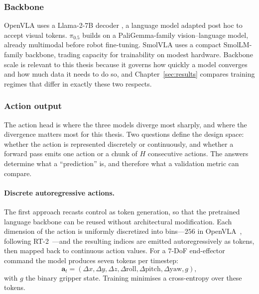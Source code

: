 \documentclass[english,12pt,a4paper,pdftex,elec,utf8]{aaltothesis}
\begin{document}
\subsubsection{Backbone}
\label{subsubsec:language}
OpenVLA uses a Llama-2-7B decoder \citep{touvron2023llama}, a language model adapted post hoc to accept visual tokens. $\pi_{0.5}$ builds on a PaliGemma-family vision--language model, already multimodal before robot fine-tuning. SmolVLA uses a compact SmolLM-family backbone, trading capacity for trainability on modest hardware. Backbone scale is relevant to this thesis because it governs how quickly a model converges and how much data it needs to do so, and Chapter~\ref{sec:results} compares training regimes that differ in exactly these two respects.

\subsubsection{Action output}
\label{subsubsec:action}

The action head is where the three models diverge most sharply, and where the divergence matters most for this thesis. Two questions define the design space: whether the action is represented discretely or continuously, and whether a forward pass emits one action or a chunk of $H$ consecutive actions. The
answers determine what a ``prediction'' is, and therefore what a validation metric can compare.

\paragraph{Discrete autoregressive actions.}
The first approach recasts control as token generation, so that the pretrained language backbone can be reused without architectural modification. Each dimension of the action is uniformly discretized into bins---$256$ in OpenVLA~\cite{kim2024openvla}, following RT-2~\cite{brohan2023rt2}---and the resulting indices are emitted autoregressively as tokens, then mapped back to continuous action values. For a $7$-DoF end-effector command the model produces seven tokens per timestep:
\begin{equation}
\mathbf{a}_t = (\Delta x, \Delta y, \Delta z,
\Delta\mathrm{roll}, \Delta\mathrm{pitch}, \Delta\mathrm{yaw}, g),
\end{equation}
with $g$ the binary gripper state. Training minimises a cross-entropy over these tokens.
\end{document}
